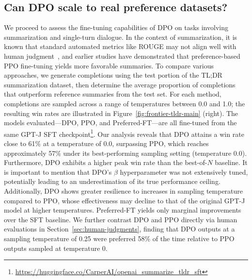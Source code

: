 \subsection{Can DPO scale to real preference datasets?}
\label{sec:dpo-real-datasets}
We proceed to assess the fine-tuning capabilities of DPO on tasks involving summarization and single-turn dialogue. In the context of summarization, it is known that standard automated metrics like ROUGE may not align well with human judgment~\citep{stiennon2022learning}, and earlier studies have demonstrated that preference-based PPO fine-tuning yields more favorable summaries. To compare various approaches, we generate completions using the test portion of the TL;DR summarization dataset, then determine the average proportion of completions that outperform reference summaries from the test set. For each method, completions are sampled across a range of temperatures between 0.0 and 1.0; the resulting win rates are illustrated in Figure~\ref{fig:frontier-tldr-main} (right). The models evaluated—DPO, PPO, and Preferred-FT—are all fine-tuned from the same GPT-J SFT checkpoint\footnote{\url{https://huggingface.co/CarperAI/openai_summarize_tldr_sft}}. Our analysis reveals that DPO attains a win rate close to 61\% at a temperature of 0.0, surpassing PPO, which reaches approximately 57\% under its best-performing sampling setting (temperature 0.0). Furthermore, DPO exhibits a higher peak win rate than the best-of-$N$ baseline. It is important to mention that DPO’s $\beta$ hyperparameter was not extensively tuned, potentially leading to an underestimation of its true performance ceiling. Additionally, DPO shows greater resilience to increases in sampling temperature compared to PPO, whose effectiveness may decline to that of the original GPT-J model at higher temperatures. Preferred-FT yields only marginal improvements over the SFT baseline. We further contrast DPO and PPO directly via human evaluations in Section~\ref{sec:human-judgments}, finding that DPO outputs at a sampling temperature of 0.25 were preferred 58\% of the time relative to PPO outputs sampled at temperature 0.

